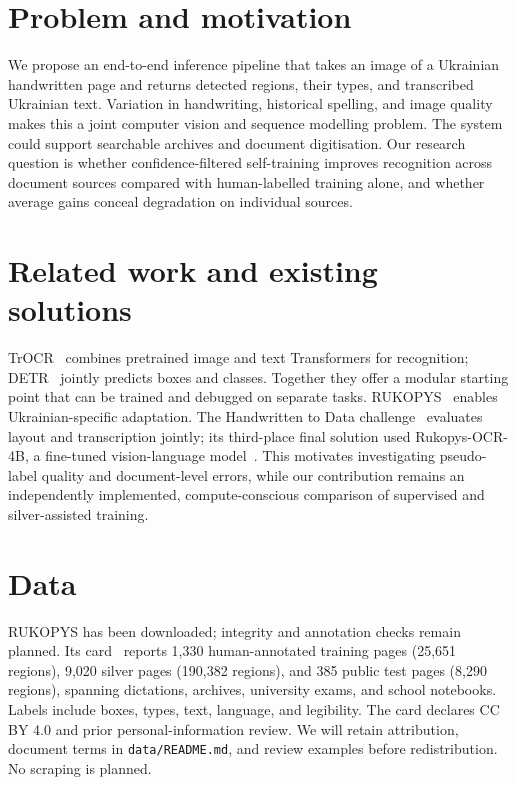 \documentclass[english]{ucuproposal}
\begin{document}
\maketitlepage

\section{Problem and motivation}
We propose an end-to-end inference pipeline that takes an image of a Ukrainian handwritten page and returns detected regions, their types, and transcribed Ukrainian text. Variation in handwriting, historical spelling, and image quality makes this a joint computer vision and sequence modelling problem. The system could support searchable archives and document digitisation. Our research question is whether confidence-filtered self-training improves recognition across document sources compared with human-labelled training alone, and whether average gains conceal degradation on individual sources.

\section{Related work and existing solutions}
TrOCR~\cite{li2021} combines pretrained image and text Transformers for recognition; DETR~\cite{carion2020} jointly predicts boxes and classes. Together they offer a modular starting point that can be trained and debugged on separate tasks. RUKOPYS~\cite{rukopys2026} enables Ukrainian-specific adaptation. The Handwritten to Data challenge~\cite{kaggle2026} evaluates layout and transcription jointly; its third-place final solution used Rukopys-OCR-4B, a fine-tuned vision-language model~\cite{ebi2026}. This motivates investigating pseudo-label quality and document-level errors, while our contribution remains an independently implemented, compute-conscious comparison of supervised and silver-assisted training.

\section{Data}
RUKOPYS has been downloaded; integrity and annotation checks remain planned. Its card~\cite{rukopys2026} reports 1,330 human-annotated training pages (25,651 regions), 9,020 silver pages (190,382 regions), and 385 public test pages (8,290 regions), spanning dictations, archives, university exams, and school notebooks. Labels include boxes, types, text, language, and legibility. The card declares CC BY 4.0 and prior personal-information review. We will retain attribution, document terms in \texttt{data/README.md}, and review examples before redistribution. No scraping is planned.
\end{document}
